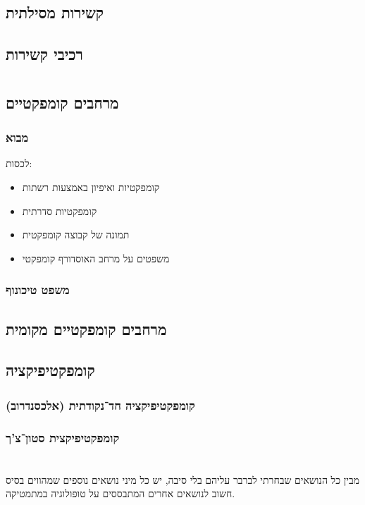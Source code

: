 \documentclass[name=רשימות טופולוגיה כללית]{../../../tex/classes/noChapterMegasumPreamble}
\begin{document}
	\subsection{\label{ss:pathwiseConnectedness}קשירות מסילתית}
	\subsection{רכיבי קשירות}
	
	\npage
	\section[קומפקטיות]{\label{s:compactness}}
	\subsection{\label{ss:comapctTopos}מרחבים קומפקטיים}
	\subsubsection{מבוא}
	לכסות: 
	\begin{itemize}
		\item קומפקטיות ואיפיון באמצעות רשתות
		\item קומפקטיות סדרתית
		\item תמונה של קבוצה קומפקטית
		\item משפטים על מרחב האוסדורף קומפקטי
	\end{itemize}
	\subsubsection{משפט טיכונוף}
	\subsection{מרחבים קומפקטיים מקומית}
	\subsection{קומפקטיפיקציה}
	\subsubsection{קומפקטיפיקציה חד־נקודתית (אלכסנדרוב)}
	\subsubsection{קומפקטיפיקצית סטון־צ'ך}
	
	\npage
	\section[נושאים נוספים]{}
	מבין כל הנושאים שבחרתי לברבר עליהם בלי סיבה, יש כל מיני נושאים נוספים שמהווים בסיס חשוב לנושאים אחרים המתבססים על טופולוגיה במתמטיקה. 
\end{document}
